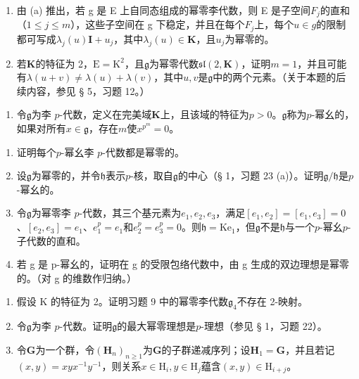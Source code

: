 \begin{enumerate}
\def\labelenumi{(\alph{enumi})}
\setcounter{enumi}{1}
\item
  由 (a) 推出，若 g 是 E 上自同态组成的幂零李代数，则 E 是子空间\(F_{j}\)的直和（\(1 \leqslant j \leqslant m\)），这些子空间在 g 下稳定，并且在每个\(F_{j}\)上，每个\(u \in g\)的限制都可写成\(\lambda_{j}(u)\mathbf{I} + u_{j}\)，其中\(\lambda_{j}(u) \in \mathbf{K}\)，且\(u_{j}\)为幂零的。
\item
  若\(\mathbf{K}\)的特征为 2，\(\mathrm{E} = \mathrm{K}^2\)，且\(\mathfrak{g}\)为幂零代数\(\mathfrak{sl}(2,\mathbf{K})\)，证明\(m = 1\)，并且可能有\(\lambda (u + v)\neq \lambda (u) + \lambda (v)\)，其中\(u,v\)是\(\mathfrak{g}\)中的两个元素。（关于本题的后续内容，参见 § 5，习题 12。）
\end{enumerate}

\begin{enumerate}
\def\labelenumi{\arabic{enumi}.}
\setcounter{enumi}{22}
\tightlist
\item
  令\(\mathfrak{g}\)为李 \(p\)-代数，定义在完美域\(\mathbf{K}\)上，且该域的特征为\(p > 0\)。\(\mathfrak{g}\)称为\(p\)-幂幺的，如果对所有\(x \in \mathfrak{g}\)，存在\(m\)使\(x^{p^m} = 0\)。
\end{enumerate}

\begin{enumerate}
\def\labelenumi{(\alph{enumi})}
\item
  证明每个\(p\)-幂幺李 \(p\)-代数都是幂零的。
\item
  设\(\mathfrak{g}\)为幂零的，并令\(\mathfrak{h}\)表示\(p\)-核，取自\(\mathfrak{g}\)的中心（§ 1，习题 23 (a)）。证明\(\mathfrak{g} / \mathfrak{h}\)是\(p\)-幂幺的。
\item
  令\(\mathfrak{g}\)为幂零李 \(p\)-代数，其三个基元素为\(e_1, e_2, e_3\)，满足\([e_1, e_2] = [e_1, e_3] = 0\)、\([e_2, e_3] = e_1\)、\(e_1^p = e_1\)和\(e_2^p = e_3^p = 0\)。则\(\mathfrak{h} = \mathrm{Ke}_1\)，但\(\mathfrak{g}\)不是\(\mathfrak{h}\)与一个\(p\)-幂幺\(p\)-子代数的直和。
\item
  若 g 是 p-幂幺的，证明在 g 的受限包络代数中，由 g 生成的双边理想是幂零的。（对 g 的维数作归纳。）
\end{enumerate}

\begin{enumerate}
\def\labelenumi{\arabic{enumi}.}
\setcounter{enumi}{23}
\item
  假设 K 的特征为 2。证明习题 9 中的幂零李代数\(\mathfrak{g}_4\)不存在 2-映射。
\item
  令\(\mathfrak{g}\)为李 \(p\)-代数。证明\(\mathfrak{g}\)的最大幂零理想是\(p\)-理想（参见 § 1，习题 22）。
\item
  令\(\mathbf{G}\)为一个群，令\((\mathbf{H}_n)_{n\geqslant 1}\)为\(\mathbf{G}\)的子群递减序列；设\(\mathbf{H}_1 = \mathbf{G}\)，并且若记\((x,y) = xyx^{-1}y^{-1}\)，则关系\(x\in \mathrm{H}_i,y\in \mathrm{H}_j\)蕴含\((x,y)\in \mathrm{H}_{i + j}\)。
\end{enumerate}

